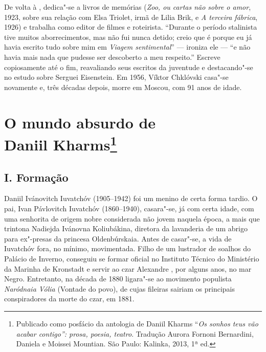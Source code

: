De volta à , dedica"-se a livros de memórias
(\emph{Zoo, ou cartas não sobre o amor}, 1923, sobre sua relação
com Elsa Triolet, irmã de Lilia Brik, e \emph{A terceira fábrica}, 1926) e trabalha como editor de filmes e roteirista. ``Durante o período stalinista
tive muitos aborrecimentos, mas não fui nunca detido; creio
que é porque eu já havia escrito tudo sobre mim em \emph{Viagem
sentimental}'' --- ironiza ele --- ``e não havia mais nada que
pudesse ser descoberto a meu respeito.'' Escreve copiosamente
até o fim, reavaliando seus escritos da juventude e destacando"-se
no estudo sobre Serguei Eisenstein. Em 1956, Víktor Chklóvski casa"-se novamente e,
três décadas depois, morre em Moscou, com 91 anos de idade.

\chapter{O mundo absurdo de\\ Daniil Kharms\footnote{Publicado
como posfácio da antologia de Daniil Kharms ``\emph{Os sonhos teus
vão acabar contigo'': prosa, poesia, teatro}. Tradução Aurora
Fornoni Bernardini, Daniela e Moissei Mountian. São Paulo:
Kalinka, 2013, 1ª ed.}}
\label{kharms}

\section{\uppercase{I}. \uppercase{F}ormação}

Daniil Ivánovitch Iuvatchóv (1905--1942) foi um menino de certa
forma tardio. O pai, Ivan Pávlovitch Iuvatchóv (1860--1940), casara"-se, já
com certa idade, com uma senhorita de origem nobre considerada
não jovem naquela época, a mais que trintona Nadiejda Ivánovna
Koliubákina, diretora da lavanderia de um abrigo para ex"-presas
da princesa Oldenbúrskaia. Antes de casar"-se, a vida de Iuvatchóv
fora, no mínimo, movimentada. Filho de um lustrador de soalhos
do Palácio de Inverno, conseguiu se formar oficial no Instituto
Técnico do Ministério da Marinha de Kronstadt e servir ao czar
Alexandre , por alguns anos, no mar Negro. Entretanto,
na década de 1880 ligara"-se ao movimento populista \emph{Naródnaia
Vólia} (Vontade do povo), de cujas fileiras sairiam os principais
conspiradores da morte do czar, em 1881.

